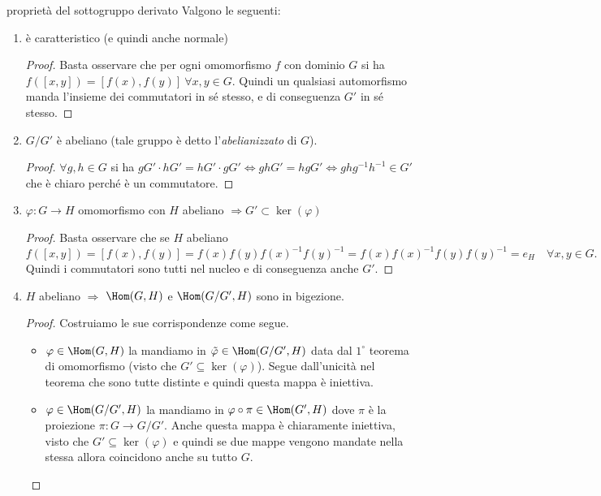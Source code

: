 \begin{proposition}{proprietà del sottogruppo derivato}
    Valgono le seguenti:
    \begin{enumerate}
        \item è caratteristico (e quindi anche normale)
        \begin{proof}
            Basta osservare che per ogni omomorfismo $f$ con dominio $G$ si ha $f([x,y]) = [f(x),f(y)] \ \forall x,y \in G$. Quindi un qualsiasi automorfismo manda l'insieme dei commutatori in sé stesso, e di conseguenza $G'$ in sé stesso.
        \end{proof}
        
        \item $G/G'$ è abeliano (tale gruppo è detto l'\textit{abelianizzato} di $G$).
        \begin{proof}
            $\forall g,h \in G$ si ha $gG' \cdot hG' =  hG' \cdot gG' \iff gh G' = hgG' \iff ghg^{-1}h^{-1} \in G'$ che è chiaro perché è un commutatore.
        \end{proof}
        
        \item $\varphi: G \rightarrow H$ omomorfismo con $H$ abeliano $\Rightarrow G' \subset \ker(\varphi)$
        \begin{proof}
            Basta osservare che se $H$ abeliano
            \[
                f([x,y]) = [f(x),f(y)] = f(x)f(y)f(x)^{-1}f(y)^{-1} = f(x)f(x)^{-1}f(y)f(y)^{-1} = e_H \quad \forall x,y \in G.
            \]
            Quindi i commutatori sono tutti nel nucleo e di conseguenza anche $G'$.
        \end{proof}
        
        \item $H$ abeliano $\Rightarrow$ $\Hom(G,H)$ e $\Hom(G/G',H)$ sono in bigezione.
        \begin{proof}
            Costruiamo le sue corrispondenze come segue. 
            \begin{itemize}
            \item $\varphi \in \Hom(G,H)$ la mandiamo in $\tilde \varphi \in \Hom(G/G',H)$ data dal $1^{\circ}$ teorema di omomorfismo (visto che $G' \subseteq \ker(\varphi)$). Segue dall'unicità nel teorema che sono tutte distinte e quindi questa mappa è iniettiva.
            \item $\varphi \in \Hom(G/G',H)$ la mandiamo in $\varphi \circ \pi \in \Hom(G',H)$ dove $\pi$ è la proiezione $\pi: G \rightarrow G/G'$. Anche questa mappa è chiaramente iniettiva, visto che $G' \subseteq \ker(\varphi)$ e quindi se due mappe vengono mandate nella stessa allora coincidono anche su tutto $G$.
            \end{itemize}
        \end{proof}
        \end{enumerate}    
\end{proposition}

